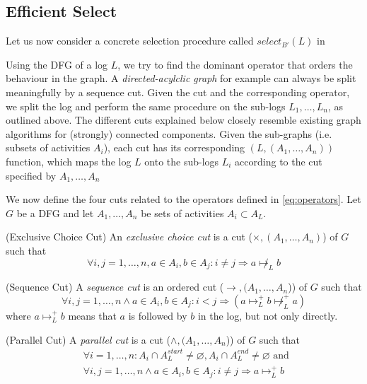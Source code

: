 \documentclass[a4paper]{IEEEtran}
\begin{document}
\subsection{Efficient Select} %
\label{ssub:efficientselect}
Let us now consider a concrete selection procedure called $select_{B'}(L)$ in \cite{inductivemining-constructive}

Using the DFG of a log $L$, we try to find the dominant operator that orders the behaviour in the graph.\cite{inductivemining-constructive} A \textit{directed-acylclic graph} for example can always be split meaningfully by a sequence cut. Given the cut and the corresponding operator, we split the log and perform the same procedure on the sub-logs $L_1, \dots, L_n$, as outlined above. The different cuts explained below closely resemble existing graph algorithms for (strongly) connected components. Given the sub-graphs (i.e. subsets of activities $A_i$), each cut has its corresponding $(L, (A_1, \dots, A_n))$ function, which maps the log $L$ onto the sub-logs $L_i$ according to the cut specified by $A_1, \dots, A_n$


We now define the four cuts related to the operators defined in \ref{eq:operators}. Let $G$ be a DFG and let $A_1, \dots, A_n$ be sets of activities $A_i \subset A_L$.

\begin{defn} (Exclusive Choice Cut)
An \textit{exclusive choice cut} is a cut ($\times, (A_1, \dots, A_n)$) of $G$ such that
$$
\forall i,j = 1, \dots, n, a \in A_i, b \in A_j: i \neq j \Rightarrow a \not \mapsto_L b
$$
\end{defn}

\begin{defn} (Sequence Cut)
A \textit{sequence cut} is an ordered cut ($\rightarrow, (A_1, \dots, A_n$)) of $G$ such that
$$
\forall i,j =1,\dots, n \wedge  a \in A_i, b \in A_j: i < j \Rightarrow (a \mapsto_L^{+} b \not \mapsto^{+}_L a)
$$
where $a \mapsto_L^{+} b$ means that $a$ is followed by $b$ in the log, but not only directly. 
\end{defn}

\begin{defn} (Parallel Cut)
A \textit{parallel cut} is a cut ($\wedge,( A_1, \dots, A_n$)) of $G$ such that
\begin{align*}
&\forall i = 1,\dots, n : A_i \cap A_L^{start} \neq \varnothing, A_i \cap A_L^{end} \neq \varnothing \text{ and } \\
&\forall i,j = 1, \dots, n \wedge a \in A_i, b \in A_j : i \neq j \Rightarrow a \mapsto_L^{+} b 
\end{align*}
\end{defn}
\end{document}
